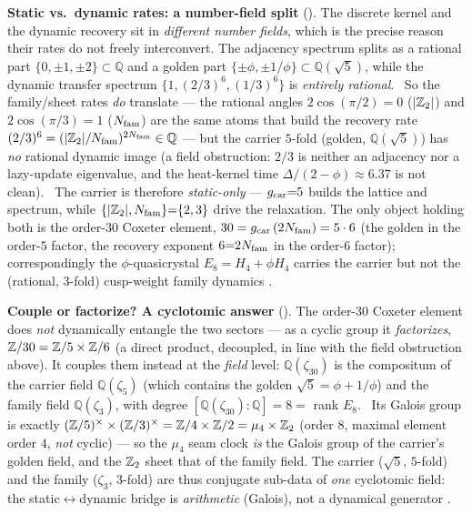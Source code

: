 \par\smallskip\noindent\textbf{Static vs.\ dynamic rates: a number-field split}
(). The discrete kernel and the dynamic recovery sit in \emph{different number
fields}, which is the precise reason their rates do not freely interconvert. The adjacency spectrum splits as a
rational part $\{0,\pm1,\pm2\}\subset\mathbb Q$ and a golden part $\{\pm\phi,\pm1/\phi\}\subset\mathbb Q(\sqrt5)$,
while the dynamic transfer spectrum $\{1,(2/3)^6,(1/3)^6\}$ is \emph{entirely rational}. \mE\ So the family/sheet
rates \emph{do} translate --- the rational angles $2\cos(\pi/2){=}0$ ($|\mathbb Z_2|$) and $2\cos(\pi/3){=}1$ ($N_{\mathrm{fam}}$)
are the same atoms that build the recovery rate $(2/3)^6=(|\mathbb Z_2|/N_{\mathrm{fam}})^{2N_{\mathrm{fam}}}\in\mathbb Q$ --- but the carrier
$5$-fold (golden, $\mathbb Q(\sqrt5)$) has \emph{no} rational dynamic image (a field obstruction: $2/3$ is neither
an adjacency nor a lazy-update eigenvalue, and the heat-kernel time $\Delta/(2-\phi)\approx6.37$ is not clean).
\mE\ The carrier is therefore \emph{static-only} --- $g_{\mathrm{car}}{=}5$ builds the lattice and spectrum, while
$\{|\mathbb Z_2|,N_{\mathrm{fam}}\}{=}\{2,3\}$ drive the relaxation. The only object holding both is the order-$30$ Coxeter element,
$30=g_{\mathrm{car}}\,(2N_{\mathrm{fam}})=5\cdot6$ (the golden in the order-$5$ factor, the recovery exponent $6{=}2N_{\mathrm{fam}}$ in the
order-$6$ factor); correspondingly the $\phi$-quasicrystal $E_8=H_4{+}\phi H_4$ carries the carrier but not the
(rational, $3$-fold) cusp-weight family dynamics \mC.

\par\smallskip\noindent\textbf{Couple or factorize? A cyclotomic answer}
(). The order-$30$ Coxeter element does \emph{not} dynamically entangle the two
sectors --- as a cyclic group it \emph{factorizes}, $\mathbb Z/30=\mathbb Z/5\times\mathbb Z/6$ (a direct product, decoupled, in line
with the field obstruction above). It couples them instead at the \emph{field} level: $\mathbb Q(\zeta_{30})$ is the
compositum of the carrier field $\mathbb Q(\zeta_5)$ (which contains the golden $\sqrt5=\phi+1/\phi$) and the family
field $\mathbb Q(\zeta_3)$, with degree $[\mathbb Q(\zeta_{30}){:}\mathbb Q]=8=$ rank $E_8$. \mE\ Its Galois group is
exactly $(\mathbb Z/5)^\times\times(\mathbb Z/3)^\times=\mathbb Z/4\times\mathbb Z/2=\mu_4\times\mathbb Z_2$ (order $8$, maximal element order $4$,
\emph{not} cyclic) --- so the $\mu_4$ seam clock \emph{is} the Galois group of the carrier's golden field, and the
$\mathbb Z_2$ sheet that of the family field. The carrier ($\sqrt5$, $5$-fold) and the family ($\zeta_3$, $3$-fold) are
thus conjugate sub-data of \emph{one} cyclotomic field: the static$\leftrightarrow$dynamic bridge is
\emph{arithmetic} (Galois), not a dynamical generator \mC.

